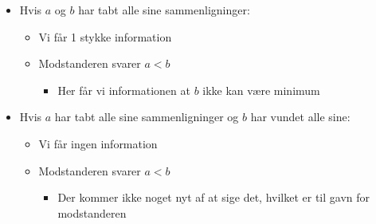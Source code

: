 \begin{frame}[allowframebreaks]
\begin{itemize}
		\item Hvis $a$ og $b$ har tabt alle sine sammenligninger:
		      \begin{itemize}
			      \item Vi får 1 stykke information
			      \item Modstanderen svarer $a < b$
			            \begin{itemize}
				            \item Her får vi informationen at $b$ ikke kan være minimum
			            \end{itemize}
		      \end{itemize}
		\item Hvis $a$ har tabt alle sine sammenligninger og $b$ har vundet alle sine:
		      \begin{itemize}
			      \item Vi får ingen information
			      \item Modstanderen svarer $a < b$
			            \begin{itemize}
				            \item Der kommer ikke noget nyt af at sige det, hvilket er til gavn for modstanderen
			            \end{itemize}
		      \end{itemize}


\end{itemize}
\end{frame}
